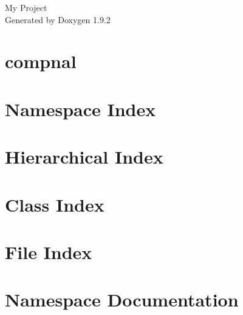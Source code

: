 \documentclass[twoside]{book}
\newcommand{\+}{\discretionary{\mbox{\scriptsize$\hookleftarrow$}}{}{}}
\newcommand{\clearemptydoublepage}{%
    \newpage{\pagestyle{empty}\cleardoublepage}%
  }
\begin{document}
  \raggedbottom
    \hypersetup{pageanchor=false,
                bookmarksnumbered=true,
                pdfencoding=unicode
               }
  \begin{titlepage}
  \vspace*{7cm}
  \begin{center}%
  {\Large My Project}\\
  \vspace*{1cm}
  {\large Generated by Doxygen 1.9.2}\\
  \end{center}
  \end{titlepage}
  \clearemptydoublepage
  \tableofcontents
  \clearemptydoublepage
  \hypersetup{pageanchor=true}
\chapter{compnal}
\label{md__r_e_a_d_m_e}

\chapter{Namespace Index}

\chapter{Hierarchical Index}

\chapter{Class Index}

\chapter{File Index}

\chapter{Namespace Documentation}






\end{document}
